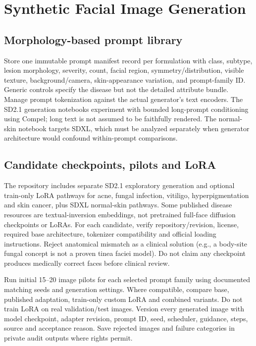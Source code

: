 \documentclass[11pt,a4paper]{article}
\begin{document}
\section{Synthetic Facial Image Generation}
\subsection{Morphology-based prompt library}
Store one immutable prompt manifest record per formulation with class, subtype, lesion morphology, severity, count, facial region, symmetry/distribution, visible texture, background/camera, skin-appearance variation, and prompt-family ID. Generic controls specify the disease but not the detailed attribute bundle. Manage prompt tokenization against the actual generator's text encoders. The SD2.1 generation notebooks experiment with bounded long-prompt conditioning using Compel; long text is not assumed to be faithfully rendered. The normal-skin notebook targets SDXL, which must be analyzed separately when generator architecture would confound within-prompt comparisons.

\subsection{Candidate checkpoints, pilots and LoRA}
The repository includes separate SD2.1 exploratory generation and optional train-only LoRA pathways for acne, fungal infection, vitiligo, hyperpigmentation and skin cancer, plus SDXL normal-skin pathways. Some published disease resources are textual-inversion embeddings, not pretrained full-face diffusion checkpoints or LoRAs. For each candidate, verify repository/revision, license, required base architecture, tokenizer compatibility and official loading instructions. Reject anatomical mismatch as a clinical solution (e.g., a body-site fungal concept is not a proven tinea faciei model). Do not claim any checkpoint produces medically correct faces before clinical review.

Run initial 15--20 image pilots for each selected prompt family using documented matching seeds and generation settings. Where compatible, compare base, published adaptation, train-only custom LoRA and combined variants. Do not train LoRA on real validation/test images. Version every generated image with model checkpoint, adapter revision, prompt ID, seed, scheduler, guidance, steps, source and acceptance reason. Save rejected images and failure categories in private audit outputs where rights permit.
\end{document}
